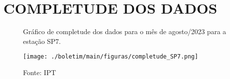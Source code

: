 \section{COMPLETUDE DOS DADOS}

\begin{figure}[htb!]
    \centering
	\captionsetup{justification=raggedright, singlelinecheck=false, width=1\textwidth}
    \caption{Gráfico de completude dos dados para o mês de agosto/2023 para a estação SP7.}
    \texttt{[image: ./boletim/main/figuras/completude\_SP7.png]} %
    \caption*{Fonte: IPT}
    \label{fig:completude}
\end{figure}

